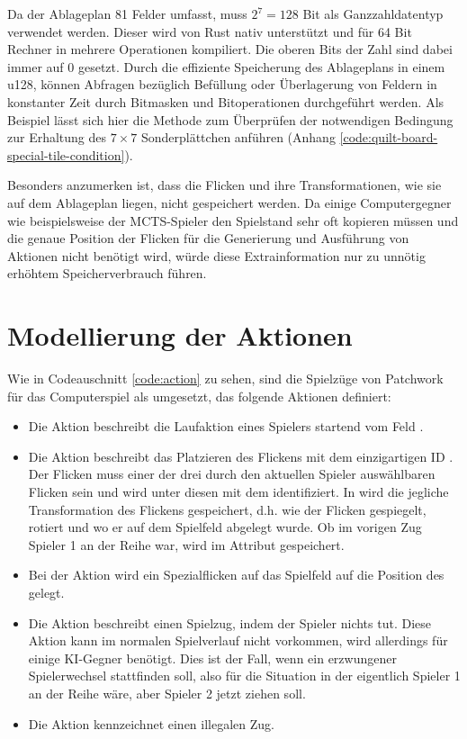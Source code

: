\vspace*{0.25cm}

Da der Ablageplan 81 Felder umfasst, muss $2^7=128$ Bit als Ganzzahldatentyp verwendet werden. Dieser wird von Rust nativ unterstützt und für 64 Bit Rechner in mehrere Operationen kompiliert. Die oberen Bits der Zahl sind dabei immer auf 0 gesetzt. Durch die effiziente Speicherung des Ablageplans in einem \ac{u128}, können Abfragen bezüglich Befüllung oder Überlagerung von Feldern in konstanter Zeit durch Bitmasken und Bitoperationen durchgeführt werden. Als Beispiel lässt sich hier die Methode zum Überprüfen der notwendigen Bedingung zur Erhaltung des $7\times 7$ Sonderplättchen anführen (Anhang \ref{code:quilt-board-special-tile-condition}).

Besonders anzumerken ist, dass die Flicken und ihre Transformationen, wie sie auf dem Ablageplan liegen, nicht gespeichert werden. Da einige Computergegner wie beispielsweise der \ac{MCTS}-Spieler den Spielstand sehr oft kopieren müssen und die genaue Position der Flicken für die Generierung und Ausführung von Aktionen nicht benötigt wird, würde diese Extrainformation nur zu unnötig erhöhtem Speicherverbrauch führen.

\section{Modellierung der Aktionen}

Wie in Codeauschnitt \ref{code:action} zu sehen, sind die Spielzüge von Patchwork für das Computerspiel als  umgesetzt, das folgende Aktionen definiert:

\pagebreak

\begin{itemize}
    \item Die Aktion  beschreibt die Laufaktion eines Spielers startend vom Feld .
    \item Die Aktion  beschreibt das Platzieren des Flickens mit dem einzigartigen \ac{ID} . Der Flicken muss einer der drei durch den aktuellen Spieler auswählbaren Flicken sein und wird unter diesen mit dem  identifiziert. In  wird die jegliche Transformation des Flickens gespeichert, d.h. wie der Flicken gespiegelt, rotiert und wo er auf dem Spielfeld abgelegt wurde. Ob im vorigen Zug Spieler 1 an der Reihe war, wird im Attribut  gespeichert.
    \item Bei der Aktion  wird ein Spezialflicken auf das Spielfeld auf die Position des  gelegt.
    \item Die Aktion  beschreibt einen Spielzug, indem der Spieler nichts tut. Diese Aktion kann im normalen Spielverlauf nicht vorkommen, wird allerdings für einige \ac{KI}-Gegner benötigt. Dies ist der Fall, wenn ein erzwungener Spielerwechsel stattfinden soll, also für die Situation in der eigentlich Spieler 1 an der Reihe wäre, aber Spieler 2 jetzt ziehen soll.
    \item Die Aktion  kennzeichnet einen illegalen Zug.
\end{itemize}

